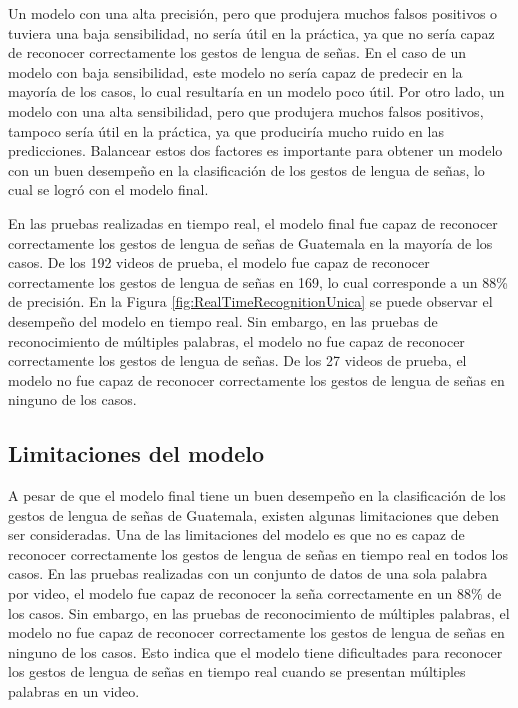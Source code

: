 Un modelo con una alta precisión, pero que produjera muchos falsos positivos o tuviera una baja sensibilidad, no sería útil en la práctica, ya que no sería capaz de reconocer correctamente los gestos de lengua de señas.
En el caso de un modelo con baja sensibilidad, este modelo no sería capaz de predecir en la mayoría de los casos, lo cual resultaría en un modelo poco útil.
Por otro lado, un modelo con una alta sensibilidad, pero que produjera muchos falsos positivos, tampoco sería útil en la práctica, ya que produciría mucho ruido en las predicciones.
Balancear estos dos factores es importante para obtener un modelo con un buen desempeño en la clasificación de los gestos de lengua de señas, lo cual se logró con el modelo final.

En las pruebas realizadas en tiempo real, el modelo final fue capaz de reconocer correctamente los gestos de lengua de señas de Guatemala en la mayoría de los casos.
De los 192 videos de prueba, el modelo fue capaz de reconocer correctamente los gestos de lengua de señas en 169, lo cual corresponde a un 88\% de precisión.
En la Figura \ref{fig:RealTimeRecognitionUnica} se puede observar el desempeño del modelo en tiempo real.
Sin embargo, en las pruebas de reconocimiento de múltiples palabras, el modelo no fue capaz de reconocer correctamente los gestos de lengua de señas.
De los 27 videos de prueba, el modelo no fue capaz de reconocer correctamente los gestos de lengua de señas en ninguno de los casos.

\subsection*{Limitaciones del modelo}

A pesar de que el modelo final tiene un buen desempeño en la clasificación de los gestos de lengua de señas de Guatemala, existen algunas limitaciones que deben ser consideradas.
Una de las limitaciones del modelo es que no es capaz de reconocer correctamente los gestos de lengua de señas en tiempo real en todos los casos.
En las pruebas realizadas con un conjunto de datos de una sola palabra por video, el modelo fue capaz de reconocer la seña correctamente en un 88\% de los casos.
Sin embargo, en las pruebas de reconocimiento de múltiples palabras, el modelo no fue capaz de reconocer correctamente los gestos de lengua de señas en ninguno de los casos.
Esto indica que el modelo tiene dificultades para reconocer los gestos de lengua de señas en tiempo real cuando se presentan múltiples palabras en un video.

